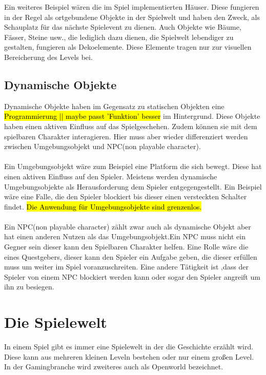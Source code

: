 Ein weiteres Beispiel wären die im Spiel implementierten Häuser. Diese fungieren in der Regel als ortgebundene Objekte in der Spielwelt und haben den Zweck, als Schauplatz für das nächste Spielevent zu dienen. Auch Objekte wie Bäume, Fässer, Steine usw., die lediglich dazu dienen, die Spielwelt lebendiger zu gestalten, fungieren als Dekoelemente. Diese Elemente tragen nur zur visuellen Bereicherung des Levels bei.


\subsection{Dynamische Objekte}
Dynamische Objekte haben im Gegensatz zu statischen Objekten eine \hl{Programmierung || maybe passt 'Funktion' besser} im Hintergrund. Diese Objekte haben einen aktiven Einfluss auf das Spielgeschehen. Zudem können sie mit dem spielbaren Charakter interagieren. Hier muss aber wieder differenziert werden zwischen Umgebungsobjekt und NPC(non playable character).\\\\ %
Ein Umgebungsobjekt wäre zum Beispiel eine Platform die sich bewegt. Diese hat einen aktiven Einfluss auf den Spieler. Meistens werden dynamische Umgebungsobjekte als Herausforderung dem Spieler entgegengestellt. Ein Beispiel wäre eine Falle, die den Spieler blockiert bis dieser einen versteckten Schalter findet. \hl{
    Die Anwendung für Umgebungsobjekte sind grenzenlos. %
}\\\\
Ein NPC(non playable character) zählt zwar auch als dynamische Objekt aber hat einen anderen Nutzen als das Umgebungsobjekt.Ein NPC muss nicht ein Gegner sein dieser kann den Spielbaren Charakter helfen. Eine Rolle wäre die eines Questgebers, dieser kann den Spieler ein Aufgabe geben, die dieser erfüllen muss um weiter im Spiel voranzuschreiten. Eine andere Tätigkeit ist ,dass der Spieler von einem NPC blockiert werden kann oder sogar den Spieler angreift um ihn zu besiegen.

\pagebreak

\section{Die Spielewelt}
In einem Spiel gibt es immer eine Spielewelt in der die Geschichte erzählt wird. Diese kann aus mehreren kleinen Leveln bestehen oder nur einem großen Level. In der Gamingbranche wird zweiteres auch als Openworld bezeichnet.


